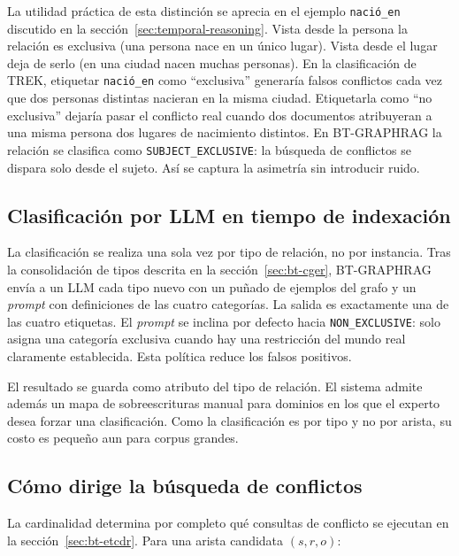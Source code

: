 La utilidad práctica de esta distinción se aprecia en el ejemplo \texttt{nació\_en} discutido en la sección~\ref{sec:temporal-reasoning}. Vista desde la persona la relación es exclusiva (una persona nace en un único lugar). Vista desde el lugar deja de serlo (en una ciudad nacen muchas personas). En la clasificación de TREK, etiquetar \texttt{nació\_en} como ``exclusiva'' generaría falsos conflictos cada vez que dos personas distintas nacieran en la misma ciudad. Etiquetarla como ``no exclusiva'' dejaría pasar el conflicto real cuando dos documentos atribuyeran a una misma persona dos lugares de nacimiento distintos. En BT-GRAPHRAG la relación se clasifica como \texttt{SUBJECT\_EXCLUSIVE}: la búsqueda de conflictos se dispara solo desde el sujeto. Así se captura la asimetría sin introducir ruido.

\subsection{Clasificación por LLM en tiempo de indexación}

La clasificación se realiza una sola vez por tipo de relación, no por instancia. Tras la consolidación de tipos descrita en la sección~\ref{sec:bt-cger}, BT-GRAPHRAG envía a un LLM cada tipo nuevo con un puñado de ejemplos del grafo y un \emph{prompt} con definiciones de las cuatro categorías. La salida es exactamente una de las cuatro etiquetas. El \emph{prompt} se inclina por defecto hacia \texttt{NON\_EXCLUSIVE}: solo asigna una categoría exclusiva cuando hay una restricción del mundo real claramente establecida. Esta política reduce los falsos positivos.

El resultado se guarda como atributo del tipo de relación. El sistema admite además un mapa de sobreescrituras manual para dominios en los que el experto desea forzar una clasificación. Como la clasificación es por tipo y no por arista, su costo es pequeño aun para corpus grandes.

\subsection{Cómo dirige la búsqueda de conflictos}

La cardinalidad determina por completo qué consultas de conflicto se ejecutan en la sección~\ref{sec:bt-etcdr}. Para una arista candidata $(s, r, o)$:

